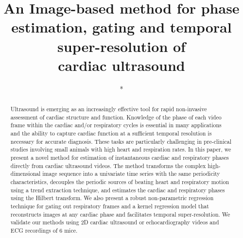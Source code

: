 \documentclass[runningheads,a4paper]{llncs}
\begin{document}
\mainmatter  %

\title{An Image-based method for phase estimation, gating and temporal super-resolution of \\cardiac ultrasound}


%
%

\author{*}
\authorrunning{*}   
\tocauthor{*}
\institute{*}

\maketitle

\begin{abstract}
Ultrasound is emerging as an increasingly effective tool for rapid non-invasive assessment of cardiac structure and function. Knowledge of the phase of each video frame within the cardiac and/or respiratory cycles is essential in many applications and the ability to capture cardiac function at a sufficient temporal resolution is necessary for accurate diagnosis. These tasks are particularly challenging in pre-clinical studies involving small animals with high heart and respiration rates. In this paper, we present a novel method for estimation of instantaneous cardiac and respiratory phases directly from cardiac ultrasound videos. The method transforms the complex high-dimensional image sequence into a univariate time series with the same periodicity characteristics, decouples the periodic sources of beating heart and respiratory motion using a trend extraction technique, and estimates the cardiac and respiratory phases using the Hilbert transform. We also present a robust non-parametric regression technique for gating out respiratory frames and a kernel regression model that reconstructs images at any cardiac phase and facilitates temporal super-resolution. We validate our methods using 2D cardiac ultrasound or echocardiography videos and ECG recordings of 6 mice.
\vspace{-0.3cm}
\end{abstract}
%
\end{document}
